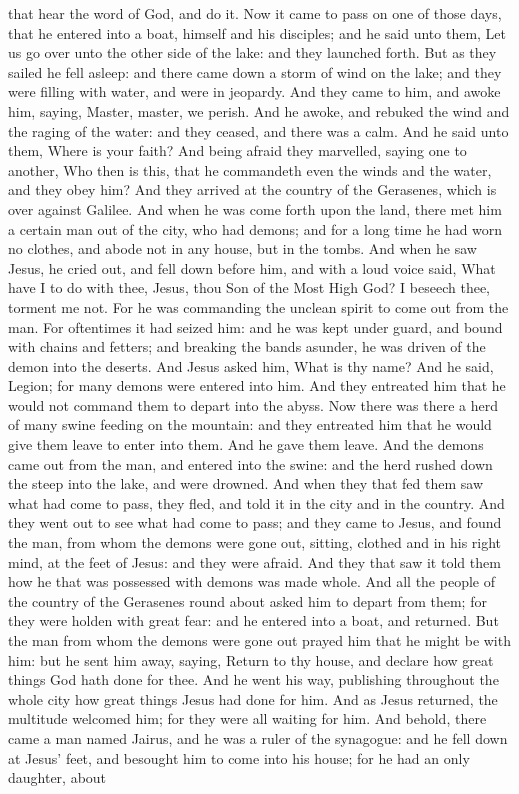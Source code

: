 that hear the word of God, and do it.  Now it came to pass on one of those days, that he entered into a boat, himself and his disciples; and he said unto them, Let us go over unto the other side of the lake: and they launched forth. But as they sailed he fell asleep: and there came down a storm of wind on the lake; and they were filling with water, and were in jeopardy. And they came to him, and awoke him, saying, Master, master, we perish. And he awoke, and rebuked the wind and the raging of the water: and they ceased, and there was a calm. And he said unto them, Where is your faith? And being afraid they marvelled, saying one to another, Who then is this, that he commandeth even the winds and the water, and they obey him?  And they arrived at the country of the Gerasenes, which is over against Galilee. And when he was come forth upon the land, there met him a certain man out of the city, who had demons; and for a long time he had worn no clothes, and abode not in any house, but in the tombs. And when he saw Jesus, he cried out, and fell down before him, and with a loud voice said, What have I to do with thee, Jesus, thou Son of the Most High God? I beseech thee, torment me not. For he was commanding the unclean spirit to come out from the man. For oftentimes it had seized him: and he was kept under guard, and bound with chains and fetters; and breaking the bands asunder, he was driven of the demon into the deserts. And Jesus asked him, What is thy name? And he said, Legion; for many demons were entered into him. And they entreated him that he would not command them to depart into the abyss. Now there was there a herd of many swine feeding on the mountain: and they entreated him that he would give them leave to enter into them. And he gave them leave. And the demons came out from the man, and entered into the swine: and the herd rushed down the steep into the lake, and were drowned. And when they that fed them saw what had come to pass, they fled, and told it in the city and in the country. And they went out to see what had come to pass; and they came to Jesus, and found the man, from whom the demons were gone out, sitting, clothed and in his right mind, at the feet of Jesus: and they were afraid. And they that saw it told them how he that was possessed with demons was made whole. And all the people of the country of the Gerasenes round about asked him to depart from them; for they were holden with great fear: and he entered into a boat, and returned. But the man from whom the demons were gone out prayed him that he might be with him: but he sent him away, saying, Return to thy house, and declare how great things God hath done for thee. And he went his way, publishing throughout the whole city how great things Jesus had done for him.  And as Jesus returned, the multitude welcomed him; for they were all waiting for him. And behold, there came a man named Jairus, and he was a ruler of the synagogue: and he fell down at Jesus’ feet, and besought him to come into his house; for he had an only daughter, about 